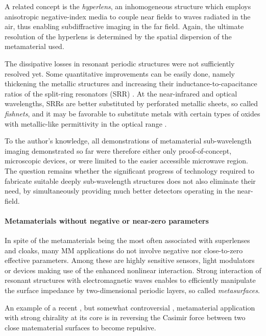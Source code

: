 A related concept is the \textit{hyperlens}, an inhomogeneous structure which employs anisotropic negative-index media to couple near fields to waves radiated in the air, thus enabling subdiffractive imaging in the far field. Again, the ultimate resolution of the hyperlens is determined by the spatial dispersion of the metamaterial used.

The dissipative losses in resonant periodic structures were not sufficiently resolved yet. Some quantitative improvements can be easily done, namely thickening the metallic structures and increasing their inductance-to-capacitance ratios of the split-ring resonators (SRR) \cite{zhou2008efficient}. At the near-infrared and optical wavelengths, SRRs are better substituted by perforated metallic sheets, so called \textit{fishnets}, %
and it may be favorable to substitute metals with certain types of oxides with metallic-like permittivity in the optical range \cite{naik2011oxides}.

To the author's knowledge, all demonstrations of metamaterial sub-wavelength imaging demonstrated so far were therefore either only proof-of-concept, microscopic devices, or were limited to the easier accessible microwave region. %
The question remains whether the significant progress of technology required to fabricate suitable deeply sub-wavelength structures does not also eliminate their need, by simultaneously providing much better detectors operating in the near-field.

\paragraph{Metamaterials without negative or near-zero parameters} %
In spite of the metamaterials being the most often associated with superlenses and cloaks, many MM applications \cite{zheludev2010road} do not involve negative nor close-to-zero effective parameters. Among these are highly sensitive sensors, light modulators or devices making use of the enhanced nonlinear interaction. Strong interaction of resonant structures with electromagnetic waves enables to efficiently manipulate the surface impedance by two-dimensional periodic layers, so called \textit{metasurfaces}.

An example of a recent \cite{zhao2009repulsive}, but somewhat controversial \cite{silveirinha2010comment}, metamaterial application with strong chirality at its core is in reversing the Casimir force between two close matematerial surfaces to become repulsive.

